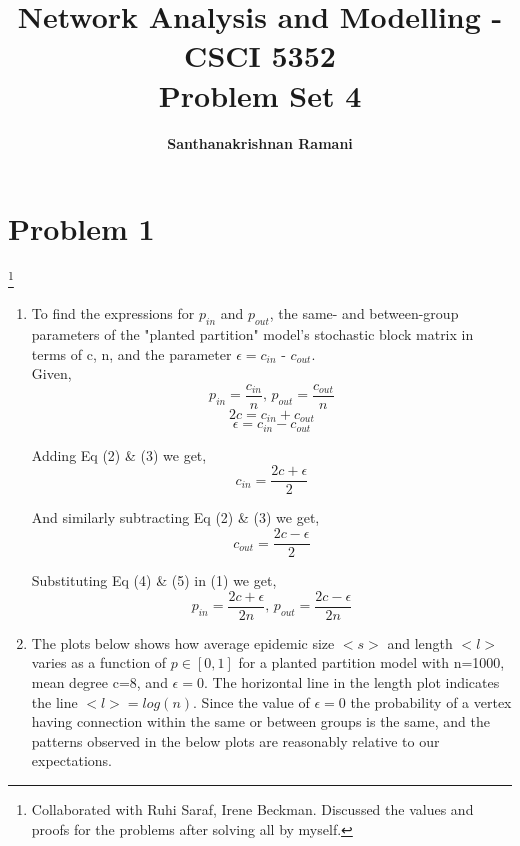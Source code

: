 \documentclass{article}
\date{\displaydate{date}}
\title{\textbf{Network Analysis and Modelling - CSCI 5352} \\
Problem Set 4}
\author{\textbf{Santhanakrishnan Ramani}}
\newcommand\blfootnote[1]{%
  \begingroup
  \renewcommand\thefootnote{}\footnote{#1}%
  \addtocounter{footnote}{-1}%
  \endgroup
}
\begin{document}
\maketitle

\section*{Problem 1}
\blfootnote{Collaborated with Ruhi Saraf, Irene Beckman. Discussed the values and proofs for the problems after solving all by myself.}
\begin{enumerate}[label=(\alph*)]
\item
To find the expressions for $p_{in}$ and $p_{out}$, the same- and between-group parameters of the "planted partition" model's stochastic block matrix in terms of c, n, and the parameter $\epsilon = c_{in}$ - $c_{out}$.\\

Given, 
\begin{equation}
p_{in} = \dfrac{c_{in}}{n},\, p_{out} = \dfrac{c_{out}}{n}
\end{equation}
\begin{equation}
2c = c_{in} + c_{out}
\end{equation}
\begin{equation}
\epsilon = c_{in} - c_{out}
\end{equation}

Adding Eq (2) \& (3) we get,
\begin{equation}
c_{in} = \dfrac{2c + \epsilon}{2}
\end{equation}

And similarly subtracting Eq (2) \& (3) we get,
\begin{equation}
c_{out} = \dfrac{2c - \epsilon}{2}
\end{equation}

Substituting Eq (4) \& (5) in (1) we get,
$$p_{in} = \dfrac{2c + \epsilon}{2n},\, p_{out} = \dfrac{2c - \epsilon}{2n}$$

\item
The plots below shows how average epidemic size $<s>$ and length $<l>$ varies as a function of $p \in [0,1]$ for a planted partition model with n=1000, mean degree c=8, and $\epsilon=0$. The horizontal line in the length plot indicates the line $<l> = log(n)$. Since the value of $\epsilon = 0$ the probability of a vertex having connection within the same or between groups is the same, and the patterns observed in the below plots are reasonably relative to our expectations.
 

\end{enumerate}
\end{document}
